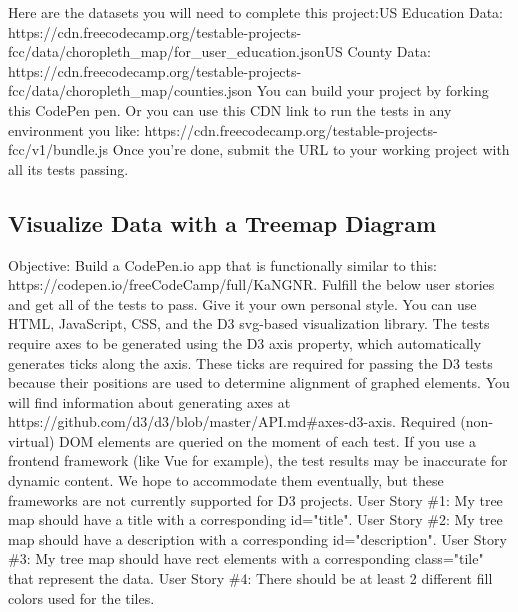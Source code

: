\documentclass{article}%
\begin{document}
Here are the datasets you will need to complete this project:US Education Data: https://cdn.freecodecamp.org/testable{-}projects{-}fcc/data/choropleth\_map/for\_user\_education.jsonUS County Data: https://cdn.freecodecamp.org/testable{-}projects{-}fcc/data/choropleth\_map/counties.json\newline%
You can build your project by forking this CodePen pen. Or you can use this CDN link to run the tests in any environment you like: https://cdn.freecodecamp.org/testable{-}projects{-}fcc/v1/bundle.js\newline%
Once you're done, submit the URL to your working project with all its tests passing.\newline%

%
\subsection{Visualize Data with a Treemap Diagram}%
\label{subsec:VisualizeDatawithaTreemapDiagram}%
Objective: Build a CodePen.io app that is functionally similar to this: https://codepen.io/freeCodeCamp/full/KaNGNR.\newline%
Fulfill the below user stories and get all of the tests to pass. Give it your own personal style.\newline%
You can use HTML, JavaScript, CSS, and the D3 svg{-}based visualization library. The tests require axes to be generated using the D3 axis property, which automatically generates ticks along the axis. These ticks are required for passing the D3 tests because their positions are used to determine alignment of graphed elements. You will find information about generating axes at https://github.com/d3/d3/blob/master/API.md\#axes{-}d3{-}axis. Required (non{-}virtual) DOM elements are queried on the moment of each test. If you use a frontend framework (like Vue for example), the test results may be inaccurate for dynamic content. We hope to accommodate them eventually, but these frameworks are not currently supported for D3 projects.\newline%
User Story \#1: My tree map should have a title with a corresponding id="title".\newline%
User Story \#2: My tree map should have a description with a corresponding id="description".\newline%
User Story \#3: My tree map should have rect elements with a corresponding class="tile" that represent the data.\newline%
User Story \#4: There should be at least 2 different fill colors used for the tiles.\newline%
\end{document}

